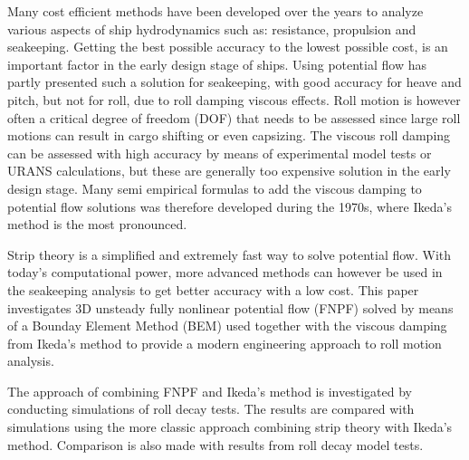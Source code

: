 Many cost efficient methods have been developed over the years to analyze various aspects of ship hydrodynamics such as: resistance, propulsion and seakeeping. Getting the best possible accuracy to the lowest possible cost, is an important factor in the early design stage of ships. Using potential flow has partly presented such a solution for seakeeping, with good accuracy for heave and pitch, but not for roll, due to  roll damping viscous effects. Roll motion is however often a critical degree of freedom (DOF) that needs to be assessed since large roll motions can result in cargo shifting or even capsizing. 
The viscous roll damping can be assessed with high accuracy by means of experimental model tests or URANS calculations, but these are generally too expensive solution in the early design stage. Many semi empirical formulas to add the viscous damping to potential flow solutions was therefore developed during the 1970s, where Ikeda's method is the most pronounced. 

Strip theory is a simplified and extremely fast way to solve potential flow. With today's computational power, more advanced methods can however be used in the seakeeping analysis to get better accuracy with a low cost. This paper investigates 3D unsteady fully nonlinear potential flow (FNPF) solved by means of a Bounday Element Method (BEM) used together with the viscous damping from Ikeda's method to provide a modern engineering approach to roll motion analysis. 

The approach of combining FNPF and Ikeda's method is investigated by conducting simulations of roll decay tests. The results are compared with simulations using the more classic approach combining strip theory with Ikeda's method. Comparison is also made with results from roll decay model tests. 



